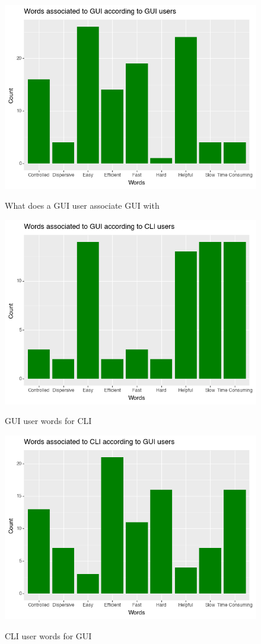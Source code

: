 \documentclass[]{report}
\begin{document}
	\begin{figure}[H]
		\centering
		\includegraphics[width=0.75\linewidth]{WordsGUIfromGUI}\\
		\caption{What does a GUI user associate GUI with}
		\label{fig: 16}
	\end{figure}
	
	\begin{figure}[H]
		\centering
		\includegraphics[width=0.75\linewidth]{WordsGUIfromCLI}\\
		\caption{GUI user words for CLI}
		\label{fig: 17}
	\end{figure}
	
	\begin{figure}[H]
		\centering
		\includegraphics[width=0.75\linewidth]{WordsCLIFromGUI}\\
		\caption{CLI user words for GUI}
		\label{fig: 18}
	\end{figure}
\newpage
\end{document}
